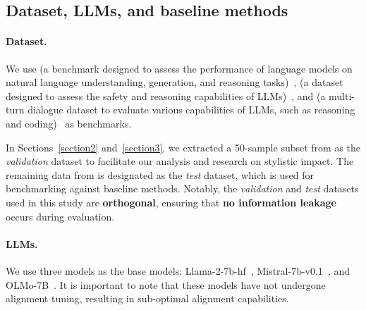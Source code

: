 \subsection{Dataset, LLMs, and baseline methods}
\paragraph{Dataset.}
We use \alpaca{} (a benchmark designed to assess the performance of language models on natural language understanding, generation, and reasoning tasks)~\citep{alpaca_eval}, \dataname{} (a dataset designed to assess the safety and reasoning capabilities of LLMs)~\citep{DBLP:conf/iclr/LinRLDSCB024}, and \mtbench{} (a multi-turn dialogue dataset to evaluate various capabilities of LLMs, such as reasoning and coding)~\citep{zheng2023judging} as benchmarks.

In Sections~\ref{section2} and~\ref{section3}, we extracted a 50-sample subset from \dataname{} as the \textit{validation} dataset to facilitate our analysis and research on stylistic impact.
The remaining data from \dataname{} is designated as the \textit{test} dataset, which is used for benchmarking against baseline methods.
Notably, the \dataname{} \textit{validation} and \textit{test} datasets used in this study are \textbf{orthogonal}, ensuring that \textbf{no information leakage} occurs during evaluation.

\paragraph{LLMs.}
We use three models as the base models: Llama-2-7b-hf~\citep{touvron2023llama}, Mistral-7b-v0.1~\citep{jiang2023mistral}, and OLMo-7B~\citep{groeneveld2024olmo}. 
It is important to note that these models have not undergone alignment tuning, resulting in sub-optimal alignment capabilities.

